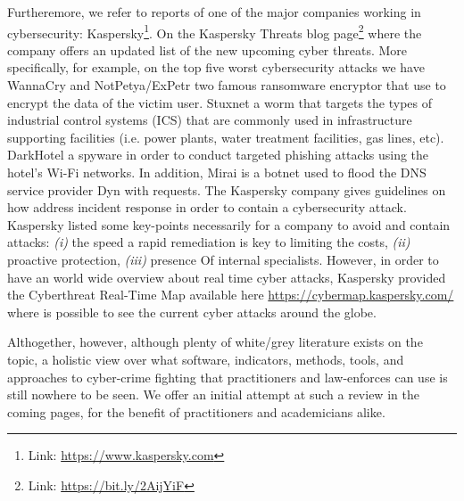 Furtheremore, we refer to reports of one of the major companies working in cybersecurity: Kaspersky\footnote{Link: \href{}{https://www.kaspersky.com}}. On the Kaspersky Threats blog page\footnote{Link: \href{}{https://bit.ly/2AijYiF}} where the company offers an updated list of the new upcoming cyber threats. More specifically, for example, on the top five worst cybersecurity attacks we have WannaCry and NotPetya/ExPetr two famous ransomware encryptor that use to encrypt the data of the victim user. Stuxnet a worm that targets the types of industrial control systems (ICS) that are commonly used in infrastructure supporting facilities (i.e. power plants, water treatment facilities, gas lines, etc). DarkHotel a spyware in order to conduct targeted phishing attacks using the hotel's Wi-Fi networks. In addition, Mirai is a botnet used to flood the DNS service provider Dyn with requests. The Kaspersky company gives guidelines \cite{kaspersky} on how address incident response in order to contain a cybersecurity attack. Kaspersky listed some key-points necessarily for a company to avoid and contain attacks: \emph{(i)} the speed a rapid remediation is key to limiting the costs, \emph{(ii)} proactive protection, \emph{(iii)} presence Of internal specialists. However, in order to have an world wide overview about real time cyber attacks, Kaspersky provided the Cyberthreat Real-Time Map available here \href{}{https://cybermap.kaspersky.com/} where is possible to see the current cyber attacks around the globe. 

Althogether, however, although plenty of white/grey literature exists on the topic, a holistic view over what software, indicators, methods, tools, and approaches to cyber-crime fighting that practitioners and law-enforces can use is still nowhere to be seen. We offer an initial attempt at such a review in the coming pages, for the benefit of practitioners and academicians alike.

